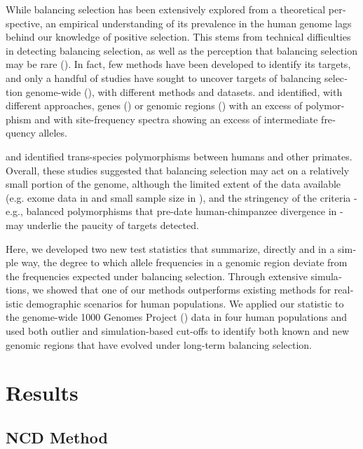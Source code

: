 \begin{refsection}
\begin{otherlanguage}{english}
While balancing selection has been extensively explored from a theoretical perspective, an empirical understanding of its prevalence in the human genome lags behind our knowledge of positive selection. This stems from technical difficulties in detecting balancing selection, as well as the perception that balancing selection may be rare (\cite{Hedrick2012}). In fact, few methods have been developed to identify its targets, and only a handful of studies have sought to uncover targets of balancing selection genome-wide (\cite{Andres2009,Alonso2008,Kummerfeld2005,Bubb2006,Leffler2013a,DeGiorgio2014,Rasmussen2014,Teixeira2015}), with different methods and datasets. \textcite{Andres2009} and \textcite{DeGiorgio2014} identified, with different approaches, genes (\cite{Andres2009}) or genomic regions (\cite{DeGiorgio2014}) with an excess of polymorphism and with site-frequency spectra showing an excess of intermediate frequency alleles.


\textcite{Leffler2013a} and \textcite{Teixeira2015} identified trans-species polymorphisms between humans and other primates. Overall, these studies suggested that balancing selection may act on a relatively small portion of the genome, although the limited extent of the data available (e.g. exome data in \cite{Andres2009} and small sample size in \cite{DeGiorgio2014}), and the stringency of the criteria - e.g., balanced polymorphisms that pre-date human-chimpanzee divergence in \textcite{Leffler2013a, Teixeira2015} - may underlie the paucity of targets detected. 


Here, we developed two new test statistics that summarize, directly and in a simple way, the degree to which allele frequencies in a genomic region deviate from the frequencies expected under balancing selection. Through extensive simulations, we showed that one of our methods outperforms existing methods for realistic demographic scenarios for human populations. We applied our statistic to the genome-wide 1000 Genomes Project (\cite{Abecasis2012}) data in four human populations and used both outlier and simulation-based cut-offs to identify both known and new genomic regions that have evolved under long-term balancing selection.

\section{Results}
\subsection{NCD Method}

\end{otherlanguage}
\end{refsection}
